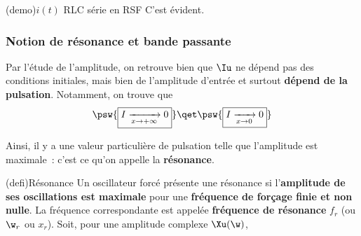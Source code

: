 \documentclass[../../main/main.tex]{subfiles}
\begin{document}
\begin{tcb*}[%
		sidebyside, sidebyside align=top, lefthand ratio=.25%
	](demo){$i(t)$ RLC série en RSF}
	C'est évident.
	\tcblower
	\vspace{-15pt}
	\psw{
		\begin{gather*}
			\f_i
			= \underbracket[1pt]{\cancel{\arg*{E_0/R}}}_{=0}
			- \arg*{1 + \jj Q \left( x - \frac{1}{x} \right)}
			\\\Ra
			\tan(\f_i) =
			- \tan\/(%
			\arg{%
			\underbracket[1pt]{1}_{\mathclap{\Re > 0}} +
			\jj Q\left( x - \frac{1}{x} \right)
			}
			)
			\\\Lra
			\boxed{\f_i = -\arctan(Q \pa{x - \frac{1}{x}})}
			\qavec
			\boxed{\f_i \in \left] - \frac{\pi}{2}\,; \frac{\pi}{2} \right[}
		\end{gather*}
	}
\end{tcb*}

\subsubsection{Notion de résonance et bande passante}
Par l'étude de l'amplitude, on retrouve bien que $\Iu$ ne dépend pas des
conditions initiales, mais bien de l'amplitude d'entrée et surtout
\textbf{dépend de la pulsation}. Notamment, on trouve que
\begin{gather*}
	\psw{
		\boxed{I \xrightarrow[x\to+\infty]{} 0}
	}
	\qet
	\psw{
		\boxed{I \xrightarrow[x\to0]{} 0}
	}
\end{gather*}

Ainsi, il y a une valeur particulière de pulsation telle que l'amplitude est
maximale~: c'est ce qu'on appelle la \textbf{résonance}.

\begin{tcb}(defi){Résonance}
	Un oscillateur forcé présente une résonance si l'\textbf{amplitude de ses
		oscillations est maximale} pour une \textbf{fréquence de forçage finie
		et non nulle}.
	\smallbreak
	La fréquence correspondante est appelée \textbf{fréquence de
		résonance} $f_r$ (ou $\w_r$ ou $x_r$).
	\smallbreak
	Soit, pour une amplitude complexe $\Xu(\w)$,
	\vspace{-15pt}
\end{tcb}
\end{document}
